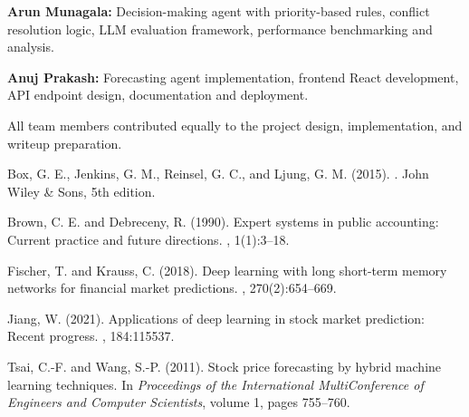 \documentclass[11pt,letterpaper]{article}
\begin{document}
\textbf{Arun Munagala:} Decision-making agent with priority-based rules, conflict resolution logic, LLM evaluation framework, performance benchmarking and analysis.

\textbf{Anuj Prakash:} Forecasting agent implementation, frontend React development, API endpoint design, documentation and deployment.

All team members contributed equally to the project design, implementation, and writeup preparation.

\begin{thebibliography}{}

Box, G. E., Jenkins, G. M., Reinsel, G. C., and Ljung, G. M. (2015).
.
\newblock John Wiley \& Sons, 5th edition.

Brown, C. E. and Debreceny, R. (1990).
\newblock Expert systems in public accounting: Current practice and future directions.
, 1(1):3--18.

Fischer, T. and Krauss, C. (2018).
\newblock Deep learning with long short-term memory networks for financial market predictions.
, 270(2):654--669.

Jiang, W. (2021).
\newblock Applications of deep learning in stock market prediction: Recent progress.
, 184:115537.

Tsai, C.-F. and Wang, S.-P. (2011).
\newblock Stock price forecasting by hybrid machine learning techniques.
\newblock In {\em Proceedings of the International MultiConference of Engineers and Computer Scientists}, volume 1, pages 755--760.

\end{thebibliography}
\end{document}
